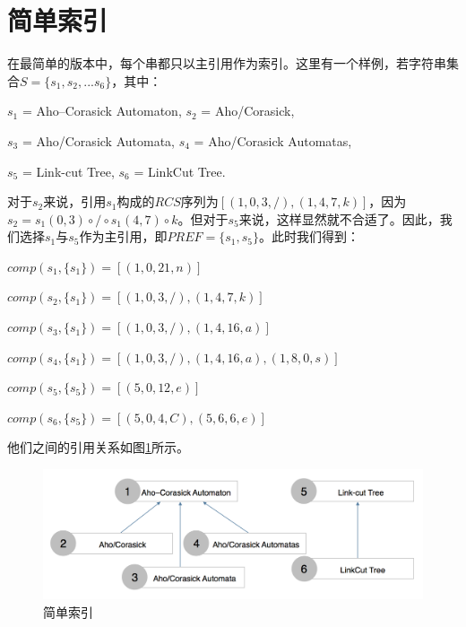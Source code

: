 ﻿\documentclass{sysuthesis}
\begin{document}
\section{简单索引}
在最简单的版本中，每个串都只以主引用作为索引。这里有一个样例，若字符串集合$S = \{s_{1}, s_{2}, ... s_{6}\}$，其中：\par
\hspace{1cm}$s_{1}$ = Aho–Corasick Automaton, $s_{2}$ = Aho/Corasick,\par
\hspace{1cm}$s_{3}$ = Aho/Corasick Automata, $s_{4}$ = Aho/Corasick Automatas,\par
\hspace{1cm}$s_{5}$ = Link-cut Tree, $s_{6}$ = LinkCut Tree.\par
对于$s_{2}$来说，引用$s_{1}$构成的$RCS$序列为$[(1, 0, 3, /), (1, 4, 7, k)]$，因为$s_{2} = s_{1}(0, 3) \circ / \circ s_{1}(4, 7) \circ k$。但对于$s_{5}$来说，这样显然就不合适了。因此，我们选择$s_{1}$与$s_{5}$作为主引用，即$PREF = \{s_{1}, s_{5}\}$。此时我们得到：\par
\hspace{1cm}$comp(s_{1}, \{s_{1}\}) = [(1, 0, 21, n)]$\par
\hspace{1cm}$comp(s_{2}, \{s_{1}\}) = [(1, 0, 3, /), (1, 4, 7, k)]$\par
\hspace{1cm}$comp(s_{3}, \{s_{1}\}) = [(1, 0, 3, /), (1, 4, 16, a)]$\par
\hspace{1cm}$comp(s_{4}, \{s_{1}\}) = [(1, 0, 3, /), (1, 4, 16, a), (1, 8, 0, s)]$\par
\hspace{1cm}$comp(s_{5}, \{s_{5}\}) = [(5, 0, 12, e)]$\par
\hspace{1cm}$comp(s_{6}, \{s_{5}\}) = [(5, 0, 4, C), (5, 6, 6, e)]$\par
他们之间的引用关系如图\ref{imag_csimple}所示。\par

\begin{figure}[htbp]
	\centering
	\includegraphics[scale=0.3]{image/csimple.png}
	\caption{简单索引}\label{imag_csimple}
\end{figure}
\end{document}
